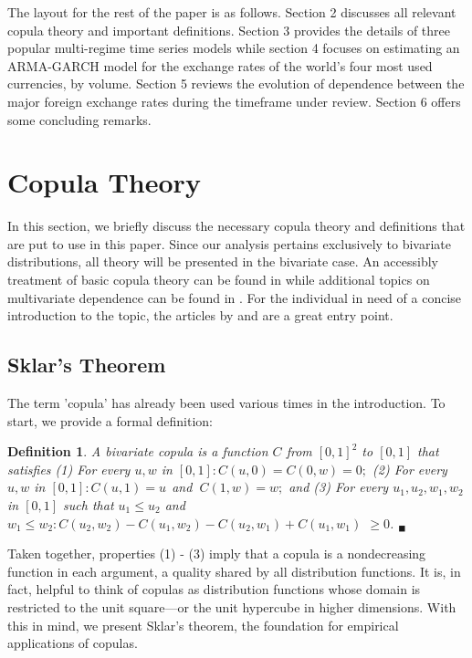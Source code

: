 \documentclass[12pt]{article}
\newtheorem{defn}{Definition}
\begin{document}
The layout for the rest of the paper is as follows. Section 2 discusses all relevant copula theory and important definitions. Section 3 provides the details of three popular multi-regime time series models while section 4 focuses on estimating an ARMA-GARCH model for the exchange rates of the world's four most used currencies, by volume. Section 5 reviews the evolution of dependence between the major foreign exchange rates during the timeframe under review. Section 6 offers some concluding remarks.

\section{Copula Theory}

In this section, we briefly discuss the necessary copula theory and definitions that are put to use in this paper. Since our analysis pertains exclusively to bivariate distributions, all theory will be presented in the bivariate case. An accessibly treatment of basic copula theory can be found in \cite{Nelsen_2007} while additional topics on multivariate dependence can be found in \cite{Joe_1997}. For the individual in need of a concise introduction to the topic, the articles by \cite{Embrechts_et_al_2003} and \cite{Genest_and_Favre_2007} are a great entry point.

\subsection{Sklar's Theorem}

The term 'copula' has already been used various times in the introduction. To start, we provide a formal definition:

\begin{defn} \label{defn:copula}
	A bivariate copula is a function $C$ from $\left[0,1\right]^{2}$ to $\left[0,1\right]$ that satisfies (1) For every $u,w$ in $\left[0,1\right] :C\left(u,0\right) = C\left(0,w\right) = 0;$ (2) For every $u,w$ in $\left[0,1\right] :C\left(u,1\right) = u\ \ $and $\ C\left(1,w\right) = w;$ and (3) For every $u_{1}, u_{2}, w_{1}, w_{2}$ in $\left[0,1\right]$ such that $u_{1} \leq u_{2}$ and $w_{1} \leq w_{2}:C\left(u_{2}, w_{2}\right) - C\left(u_{1}, w_{2}\right) - C\left(u_{2}, w_{1}\right) + C\left(u_{1}, w_{1}\right)$ $\geq 0$. $_{\blacksquare}$
\end{defn}

Taken together, properties (1) - (3) imply that a copula is a nondecreasing function in each argument, a quality shared by all distribution functions. It is, in fact, helpful to think of copulas as distribution functions whose domain is restricted to the unit square---or the unit hypercube in higher dimensions. With this in mind, we present Sklar's theorem, the foundation for empirical applications of copulas.
\end{document}
